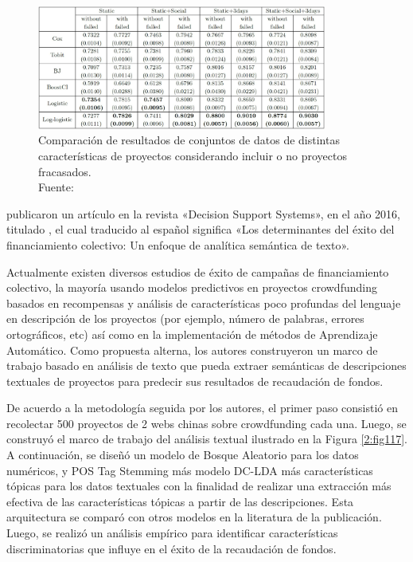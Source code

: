 \begin{figure}[!ht]
	\begin{center}
		\includegraphics[width=0.85\textwidth]{2/figures/li2016.jpg}
		\caption[Comparación de resultados de conjuntos de datos de distintas características de proyectos considerando incluir o no proyectos fracasados]{Comparación de resultados de conjuntos de datos de distintas características de proyectos considerando incluir o no proyectos fracasados.\\
			Fuente: \cite{pr_li2016predcrowd}}
		\label{2:fig116}
	\end{center}
\end{figure}

\cite{pr_yuan2016textanalytics} publicaron un artículo en la revista «Decision Support Systems», en el año 2016, titulado , el cual traducido al español significa «Los determinantes del éxito del financiamiento colectivo: Un enfoque de analítica semántica de texto».

Actualmente existen diversos estudios de éxito de campañas de financiamiento colectivo, la mayoría usando modelos predictivos en proyectos crowdfunding basados en recompensas y análisis de características poco profundas del lenguaje en descripción de los proyectos (por ejemplo, número de palabras, errores ortográficos, etc) así como en la implementación de métodos de Aprendizaje Automático. Como propuesta alterna, los autores construyeron un marco de trabajo basado en análisis de texto que pueda extraer semánticas de descripciones textuales de proyectos para predecir sus resultados de recaudación de fondos.

De acuerdo a la metodología seguida por los autores, el primer paso consistió en recolectar 500 proyectos de 2 webs chinas sobre crowdfunding cada una. Luego, se construyó el marco de trabajo del análisis textual ilustrado en la Figura \ref{2:fig117}. A continuación, se diseñó un modelo de Bosque Aleatorio para los datos numéricos, y POS Tag Stemming más modelo DC-LDA más características tópicas para los datos textuales con la finalidad de realizar una extracción más efectiva de las características tópicas a partir de las descripciones. Esta arquitectura se comparó con otros modelos en la literatura de la publicación. Luego, se realizó un análisis empírico para identificar características discriminatorias que influye en el éxito de la recaudación de fondos.

